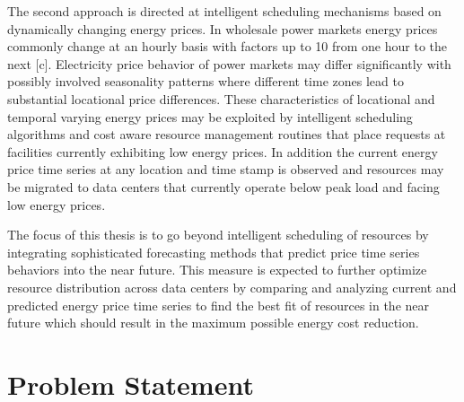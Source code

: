 The second approach is directed at intelligent scheduling mechanisms based on dynamically changing energy prices. In wholesale power markets energy prices commonly change at an hourly basis with factors up to 10 from one hour to the next [c]. Electricity price behavior of power markets may differ significantly with possibly involved seasonality patterns where different time zones lead to substantial locational price differences. These characteristics of locational and temporal varying energy prices may be exploited by intelligent scheduling algorithms and cost aware resource management routines that place requests at facilities currently exhibiting low energy prices. In addition the current energy price time series at any location and time stamp is observed and resources may be migrated to data centers that currently operate below peak load and facing low energy prices. %

The focus of this thesis is to go beyond intelligent scheduling of resources %
by integrating sophisticated forecasting methods that predict price time series behaviors into the near future. This measure is expected to further optimize resource distribution across data centers by comparing and analyzing current and predicted energy price time series to find the best fit of resources in the near future which should result in the maximum possible energy cost reduction.



\section{Problem Statement}

